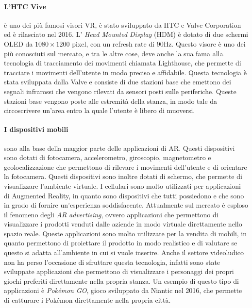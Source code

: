         \paragraph{L'HTC Vive} è uno dei più famosi visori VR, è stato sviluppato da HTC e Valve Corporation ed è
            rilasciato nel 2016. L' \textit{Head Mounted Display} (HDM) è dotato di due schermi OLED da $1080\times1200$ pixel, 
            con un refresh rate di 90Hz\cite{Vive}. Questo visore è uno dei più conosciuti sul mercato, 
            e tra le altre cose, deve anche la sua fama alla tecnologia di tracciamento dei movimenti chiamata Lighthouse, che permette di tracciare
            i movimenti dell'utente in modo preciso e affidabile. Questa tecnologia è stata sviluppata dalla Valve
            e consiste di due stazioni base che emettono dei segnali infrarossi che vengono rilevati da sensori posti 
            sulle periferiche. Queste stazioni base vengono poste alle estremità della stanza, in modo tale da circoscrivere
            un'area entro la quale l'utente è libero di muoversi.

        \paragraph{I dispositivi mobili} sono alla base della maggior parte delle applicazioni di AR. Questi dispositivi
            sono dotati di fotocamera, accelerometro, giroscopio, magnetometro e geolocalizzazione che permettono di rilevare i movimenti
            dell'utente e di orientare la fotocamera. Questi dispositivi sono inoltre dotati di schermo, che permette di
            visualizzare l'ambiente virtuale. I cellulari sono molto utilizzati per applicazioni di Augmented Reality, in quanto
            sono dispositivi che tutti possiedono e che sono in grado di fornire un'esperienza soddisfacente.
            Attualmente sul mercato è esploso il fenomeno degli \textit{AR advertising}, ovvero applicazioni che permettono
            di visualizzare i prodotti venduti dalle aziende in modo virtuale direttamente nello spazio reale. Queste applicazioni
            sono molto utilizzate per la vendita di mobili, in quanto permettono di proiettare il prodotto in modo realistico
            e di valutare se questo si adatta all'ambiente in cui si vuole inserire. Anche il settore videoludico non ha 
            perso l'occasione di sfruttare questa tecnologia, infatti sono state sviluppate applicazioni che permettono di
            visualizzare i personaggi dei propri giochi preferiti direttamente nella propria stanza. Un esempio di questo
            tipo di applicazioni è \textit{Pokémon GO}, gioco sviluppato da Niantic nel 2016, che permette di catturare i
            Pokémon direttamente nella propria città.
            


